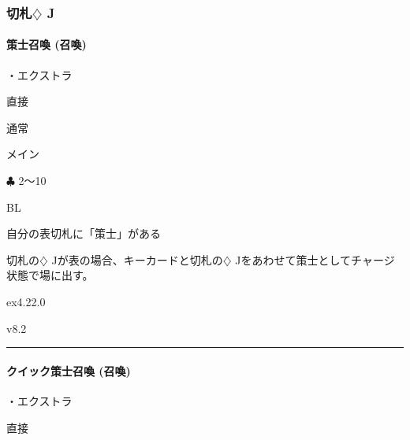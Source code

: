 \documentclass[letterpaper,10pt,dvipdfmx]{sphinxmanual}
\begin{document}
\subsubsection{切札{\normalsize $\diamondsuit$} J}
\label{\detokenize{auto/frameActionlist:id64}}

\paragraph{策士召喚 (召喚)}
\label{\detokenize{auto/frameActionlist:act-summonstrategist}}\label{\detokenize{auto/frameActionlist:id65}}
\sphinxAtStartPar
{}

\sphinxAtStartPar
・エクストラ

\sphinxAtStartPar
{} 直接

\sphinxAtStartPar
{} 通常

\sphinxAtStartPar
{} メイン

\sphinxAtStartPar
{} {\normalsize $\clubsuit$} 2〜10

\sphinxAtStartPar
{} BL

\sphinxAtStartPar
{}

\sphinxAtStartPar
自分の表切札に「策士」がある

\sphinxAtStartPar
{}

\sphinxAtStartPar
切札の{\normalsize $\diamondsuit$} Jが表の場合、キーカードと切札の{\normalsize $\diamondsuit$} Jをあわせて策士としてチャージ状態で場に出す。

\sphinxAtStartPar
{}  ex4.22.0

\sphinxAtStartPar
{}  v8.2


\bigskip\hrule\bigskip



\paragraph{クイック策士召喚 (召喚)}
\label{\detokenize{auto/frameActionlist:act-quicksummonstrategist}}\label{\detokenize{auto/frameActionlist:id66}}
\sphinxAtStartPar
{}

\sphinxAtStartPar
・エクストラ

\sphinxAtStartPar
{} 直接
\end{document}
